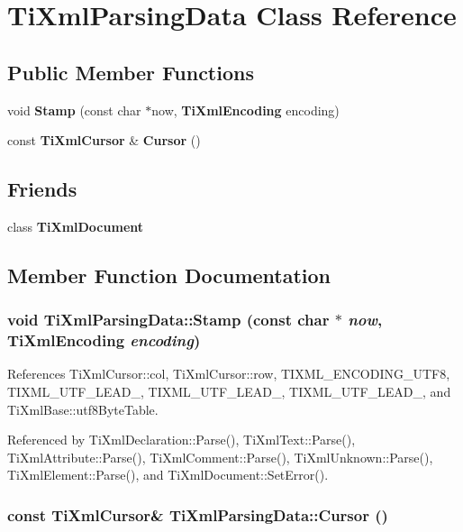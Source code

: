\section{TiXmlParsingData Class Reference}
\label{classTiXmlParsingData}
\subsection*{Public Member Functions}
\begin{CompactItemize}
\item 
void {\bf Stamp} (const char $\ast$now, {\bf TiXmlEncoding} encoding)
\item 
const {\bf TiXmlCursor} \& {\bf Cursor} ()
\end{CompactItemize}
\subsection*{Friends}
\begin{CompactItemize}
\item 
class {\bf TiXmlDocument}
\end{CompactItemize}


\subsection{Member Function Documentation}
\subsubsection[Stamp]{\setlength{\rightskip}{0pt plus 5cm}void TiXmlParsingData::Stamp (const char $\ast$ {\em now}, \/  {\bf TiXmlEncoding} {\em encoding})}\label{classTiXmlParsingData_65cee8ab77a36c605db08c84b4c30a7d}




References TiXmlCursor::col, TiXmlCursor::row, TIXML\_\-ENCODING\_\-UTF8, TIXML\_\-UTF\_\-LEAD\_, TIXML\_\-UTF\_\-LEAD\_, TIXML\_\-UTF\_\-LEAD\_, and TiXmlBase::utf8ByteTable.

Referenced by TiXmlDeclaration::Parse(), TiXmlText::Parse(), TiXmlAttribute::Parse(), TiXmlComment::Parse(), TiXmlUnknown::Parse(), TiXmlElement::Parse(), and TiXmlDocument::SetError().
\subsubsection[Cursor]{\setlength{\rightskip}{0pt plus 5cm}const {\bf TiXmlCursor}\& TiXmlParsingData::Cursor ()\hspace{0.3cm}{\tt  [inline]}}\label{classTiXmlParsingData_56908a17d7d7a6b2e511e62cf1d40d05}




